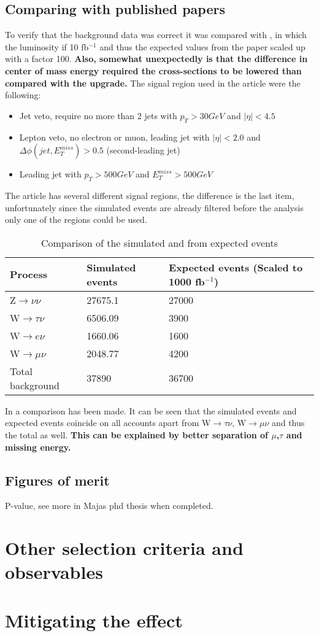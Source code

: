 \subsection{Comparing with published papers} 	
To verify that the background data was correct it was compared with \citep{ATLAS-CONF-2012-147}, in which the luminosity if 10 fb$^{-1}$ and thus the expected values from the paper scaled up with a factor 100. \textbf{Also, somewhat unexpectedly is that the difference in center of mass energy required the cross-sections to be lowered than compared with the upgrade.} The signal region used in the article were the following:
\begin{itemize}
\item Jet veto, require no more than 2 jets with $p_T > 30 GeV$ and $|\eta| < 4.5$
\item Lepton veto, no electron or muon, leading jet with $|\eta| < 2.0$ and $\Delta \phi (jet, E_T^{miss})>0.5$ (second-leading jet)
\item Leading jet with $p_T > 500 GeV$ and $E_T^{miss}>500 GeV$
\end{itemize}
The article has several different signal regions, the difference is the last item, unfortunately since the simulated events are already filtered before the analysis only one of the regions could be used.
\begin{table}[ht]
\begin{center}
\begin{tabular}{|l|l|l|}
\hline
Process & Simulated events & Expected events (Scaled to 1000 fb$^{-1}$) \\ \hline
Z$\rightarrow\nu\nu$&27675.1&27000 \\
W$\rightarrow\tau\nu$&6506.09&3900 \\
W$\rightarrow e\nu$&1660.06&1600 \\
W$\rightarrow\mu\nu$&2048.77&4200 \\
Total background&37890&36700 \\ \hline
\end{tabular}
\caption{Comparison of the simulated and from \citep{ATLAS-CONF-2012-147} expected events}
\label{tab:Compare1}
\end{center}
\end{table}

In  a comparison has been made. It can be seen that the simulated events and expected events coincide on all accounts apart from W$\rightarrow\tau\nu$, W$\rightarrow\mu\nu$ and thus the total as well. \textbf{This can be explained by better separation of $\mu$,$\tau$ and missing energy.} 

\subsection{Figures of merit}
P-value, see more in Majas phd thesis when completed.
\section{Other selection criteria and observables}
\section{Mitigating the effect}